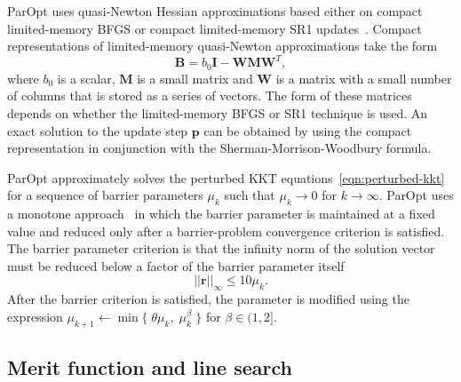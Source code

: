 \documentclass[12pt]{article}
\newcommand{\mb}{\mathbf}
\begin{document}
ParOpt uses quasi-Newton Hessian approximations based either on compact limited-memory BFGS or compact limited-memory SR1 updates~\citep{Byrd:1994:quasi-Newton-LBFGS}.
Compact representations of limited-memory quasi-Newton approximations take the form
%
\begin{equation*}
  \mb{B} = b_0\mb{I} - \mb{W}\mb{M}\mb{W}^{T},
\end{equation*}
where $b_0$ is a scalar, $\mb{M}$ is a small matrix and $\mb{W}$ is a matrix with a small number of columns that is stored as a series of vectors.
The form of these matrices depends on whether the limited-memory BFGS or SR1 technique is used.
An exact solution to the update step $\mb{p}$ can be obtained by using the compact representation in conjunction with the Sherman-Morrison-Woodbury formula.

ParOpt approximately solves the perturbed KKT equations~\eqref{eqn:perturbed-kkt} for a sequence of barrier parameters $\mu_{k}$ such that $\mu_{k} \rightarrow 0$ for $k \rightarrow \infty$.
ParOpt uses a monotone approach~\citet{Fiacco:McCormick:1990} in which the barrier parameter is maintained at a fixed value and reduced only after a barrier-problem convergence criterion is satisfied.
The barrier parameter criterion is that the infinity norm of the solution vector must be reduced below a factor of the barrier parameter itself
%
\begin{equation}
  \label{eqn:barrier-stopping-criterion}
  ||\mb{r}||_{\infty}  \le 10 \mu_{k}.
\end{equation}
After the barrier criterion is satisfied, the parameter is modified using the expression $\mu_{k+1} \leftarrow \min \{ \; \theta \mu_{k},\; \mu_{k}^{\beta}\;\}$ for $\beta \in (1, 2]$.

\subsection{Merit function and line search}
\end{document}
